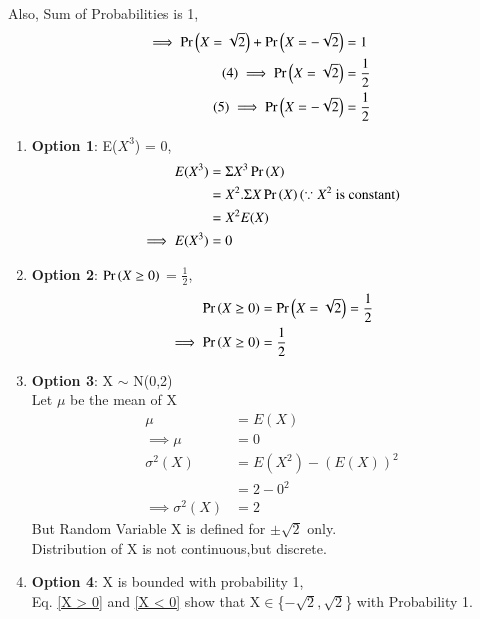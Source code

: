 \documentclass[journal,12pt,twocolumn]{IEEEtran}
\begin{document}
Also, Sum of Probabilities is 1,
\begin{align*}
    \implies \Pr\left(X = \sqrt{2}\right) + \Pr\left(X =-\sqrt{2}\right) &= 1 \\
    \tag{4} \label{X > 0}
    \implies                     \Pr\left(X = \sqrt{2}\right) &= \frac{1}{2} \\
    \tag{5} \label{X < 0}
    \implies                    \Pr\left(X = -\sqrt{2}\right) &= \frac{1}{2}
\end{align*}
\begin{enumerate}
\item \textbf{Option 1}: E($X^3$) = 0,
\begin{align*}
    E(X^3) &= \Sigma X^3 \Pr\left(X\right) \\
           &= X^2 .\Sigma X \Pr\left(X\right) (\because X^2 \text{ is constant}) \\
           &= X^2 E(X)\\
\implies E(X^3) &= 0      
\end{align*} 
\begin{center}
\end{center}
\vspace{0.8cm}
\item \textbf{Option 2}: $\Pr\left(X \ge 0\right)$ = $\frac{1}{2}$,
\begin{align*}
    \Pr\left(X\ge 0\right) &= \Pr\left(X = \sqrt{2}\right) = \frac{1}{2} \\
    \implies \Pr\left(X \ge 0\right) &= \frac{1}{2}
\end{align*}
\begin{center}
\end{center}
\vspace{0.1cm}
\item \textbf{Option 3}: X $\sim$ N(0,2) \\
Let $\mu$ be the mean of X
\begin{align*}
            \mu &= E(X) \\
    \tag{6} \label{mu}
   \implies \mu &= 0 \\
      \sigma^2(X) &= E(X^2) - (E(X))^{2} \\
                &= 2 - 0^{2} \\
                \tag{7} 
\implies \sigma^2(X) &= 2
\end{align*}
But Random Variable X is defined for $\pm\sqrt{2}$ only.\\
Distribution of X is not continuous,but discrete.
\vspace{0.3cm}
\begin{center}
\end{center}
\vspace{0.3cm}
\item \textbf{Option 4}: X is bounded with probability 1, \\
Eq. \eqref{X > 0} and \eqref{X < 0} show that X$\in$\{{$-\sqrt{2},\sqrt{2}$}\} with Probability 1. 
\vspace{0.5cm} \\
\centering {}
\end{enumerate}
\vspace{0.5cm}
\centering {}
\end{document}
